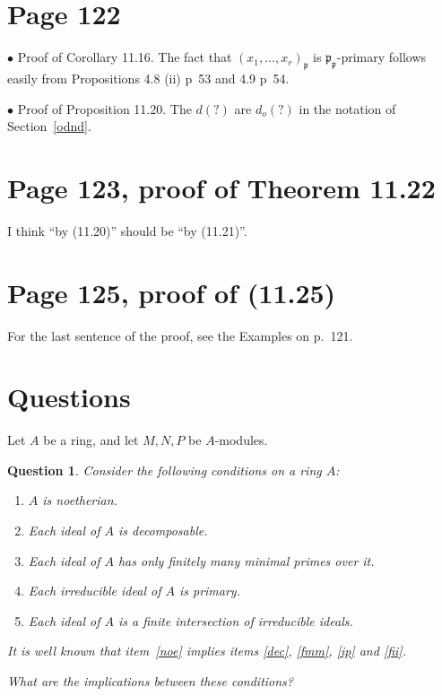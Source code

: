 \documentclass[parskip=half]{scrartcl}%
\newcommand{\mf}{\mathfrak}
\newcommand{\bu}{\bullet}
\newtheorem{qn}[thm]{Question}
\begin{document}
\section{Page 122}%

$\bu$ Proof of Corollary 11.16. The fact that $(x_1,\dots,x_r)_{\mf p}$ is $\mf p_{\mf p}$-primary follows easily from Propositions 4.8 (ii) p~53 and 4.9 p~54.

$\bu$ Proof of Proposition 11.20. The $d(?)$ are $d_o(?)$ in the notation of Section~\ref{odnd}.

\section{Page 123, proof of Theorem 11.22}%

I think ``by (11.20)'' should be ``by (11.21)''.

\section{Page 125, proof of (11.25)}%

For the last sentence of the proof, see the Examples on p.~121.

\section{Questions}%

Let $A$ be a ring, and let $M,N,P$ be $A$-modules.



\begin{qn}
Consider the following conditions on a ring $A$:

\begin{enumerate}
\item\label{noe} $A$ is noetherian.
\item\label{dec} Each ideal of $A$ is decomposable.
\item\label{fmm} Each ideal of $A$ has only finitely many minimal primes over it.
\item\label{ip} Each irreducible ideal of $A$ is primary.
\item\label{fii} Each ideal of $A$ is a finite intersection of irreducible ideals.
\end{enumerate}

It is well known that item~\ref{noe} implies items \ref{dec}, \ref{fmm}, \ref{ip} and \ref{fii}.%

What are the implications between these conditions?
\end{qn}
\end{document}
